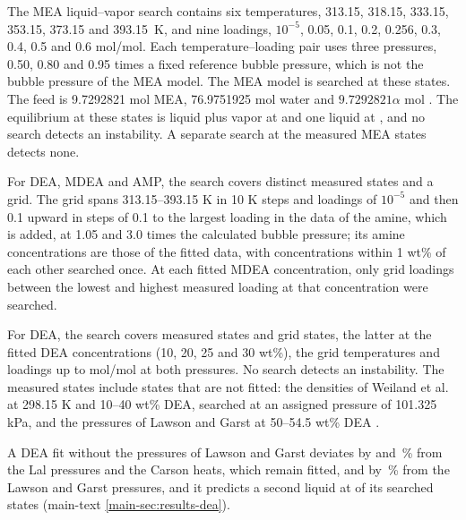 \documentclass[a4paper,11pt]{article}
\begin{document}
The MEA liquid--vapor search contains six temperatures, 313.15, 318.15, 333.15, 353.15, 373.15 and \SI{393.15}{\kelvin}, and nine loadings, $10^{-5}$, 0.05, 0.1, 0.2, 0.256, 0.3, 0.4, 0.5 and 0.6 mol/mol.
Each temperature--loading pair uses three pressures, 0.50, 0.80 and 0.95 times a fixed reference bubble pressure, which is not the bubble pressure of the MEA model.
The MEA model is searched at these  states.
The feed is 9.7292821 mol MEA, 76.9751925 mol water and $9.7292821\alpha$ mol \COtwo.
The equilibrium at these states is liquid plus vapor at  and one liquid at , and no search detects an instability.
A separate search at the  measured MEA states detects none.

For DEA, MDEA and AMP, the search covers distinct measured states and a grid.
The grid spans 313.15--393.15 K in 10 K steps and loadings of $10^{-5}$ and then 0.1 upward in steps of 0.1 to the largest loading in the data of the amine, which is added, at 1.05 and 3.0 times the calculated bubble pressure; its amine concentrations are those of the fitted data, with concentrations within 1 wt\% of each other searched once.
At each fitted MDEA concentration, only grid loadings between the lowest and highest measured loading at that concentration were searched.

For DEA, the search covers  measured states and  grid states, the latter at the  fitted DEA concentrations (10, 20, 25 and 30 wt\%), the  grid temperatures and  loadings up to  mol/mol at both pressures.
No search detects an instability.
The measured states include states that are not fitted: the densities of Weiland et al.\ \cite{Weiland1998} at 298.15 K and 10--40 wt\% DEA, searched at an assigned pressure of 101.325 kPa, and the pressures of Lawson and Garst at 50--54.5 wt\% DEA \cite{lawsonGasSweeteningData1976}.

A DEA fit without the pressures of Lawson and Garst deviates by  and \,\% from the Lal pressures and the Carson heats, which remain fitted, and by \,\% from the Lawson and Garst pressures, and it predicts a second liquid at  of its  searched states (main-text \cref{main-sec:results-dea}).
\end{document}
